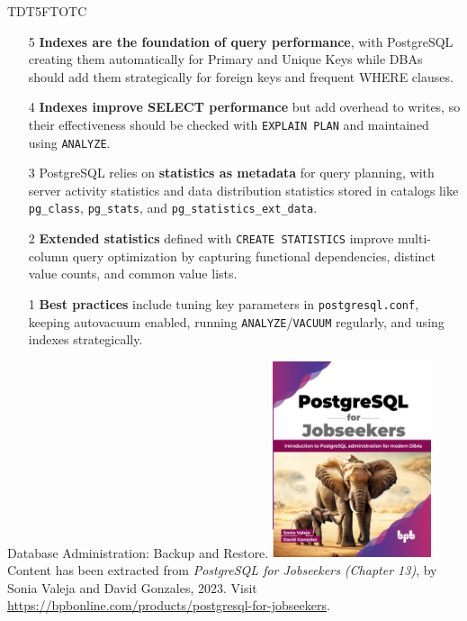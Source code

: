 \documentclass[aspectratio=169]{beamer}
\begin{document}
\begin{frame}{TDT5FTOTC}
    \pause
    \begin{itemize}
        \item[5] \textbf{Indexes are the foundation of query performance}, with PostgreSQL creating them automatically for Primary and Unique Keys while DBAs should add them strategically for foreign keys and frequent WHERE clauses. \pause

        \item[4] \textbf{Indexes improve SELECT performance} but add overhead to writes, so their effectiveness should be checked with \texttt{EXPLAIN PLAN} and maintained using \texttt{ANALYZE}. \pause

        \item[3] PostgreSQL relies on \textbf{statistics as metadata} for query planning, with server activity statistics and data distribution statistics stored in catalogs like \texttt{pg\_class}, \texttt{pg\_stats}, and \texttt{pg\_statistics\_ext\_data}. \pause

        \item[2] \textbf{Extended statistics} defined with \texttt{CREATE STATISTICS} improve multi-column query optimization by capturing functional dependencies, distinct value counts, and common value lists. \pause

        \item[1] \textbf{Best practices} include tuning key parameters in \texttt{postgresql.conf}, keeping autovacuum enabled, running \texttt{ANALYZE}/\texttt{VACUUM} regularly, and using indexes strategically.
    \end{itemize}
\end{frame}

\begin{frame}{Database Administration: Backup and Restore.}
    \centering
    \includegraphics[width=0.35\textwidth]{figures/book_cover}\\
    \vspace{2mm}
    {
        \scriptsize
        Content has been extracted from \textit{PostgreSQL for Jobseekers (Chapter 13)}, by Sonia Valeja and David Gonzales, 2023.  Visit \url{https://bpbonline.com/products/postgresql-for-jobseekers}.\\
    }
\end{frame}
\end{document}
